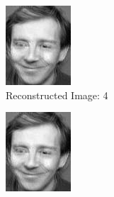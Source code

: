 \documentclass[12pt]{article}
\begin{document}
\begin{figure}
\begin{subfigure}[b]{0.20\textwidth}
		\includegraphics[width=\textwidth]{Task4.3_Images/ReconstructedImage4.jpg}
		\caption{Reconstructed Image: 4}
	\end{subfigure}\quad
	\begin{subfigure}[b]{0.20\textwidth}
		\includegraphics[width=\textwidth]{Task4.3_Images/ReconstructedImage5.jpg}

\end{subfigure}
\end{figure}
\end{document}
